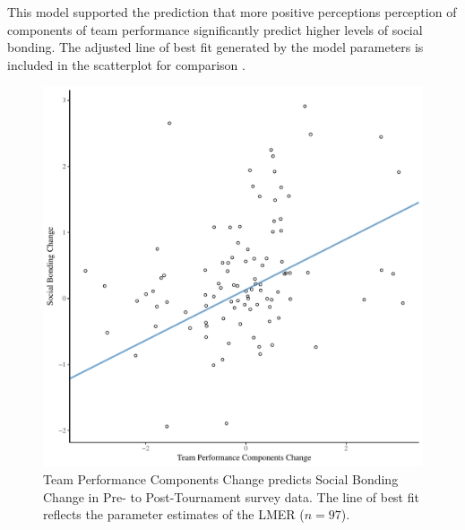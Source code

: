 \begin{CJK}{UTF8}{gbsn}
This model supported the prediction that more positive perceptions perception of components of team performance significantly predict  higher levels of social bonding. The adjusted line of best fit generated by the model parameters is included in the scatterplot for comparison .


  \begin{figure}[htbp]
    \centering
  \includegraphics[scale=.5]{images/jasBondDeltaModelSlope.pdf}
    \caption{Team Performance Components Change predicts Social Bonding Change in Pre- to Post-Tournament survey data. The line of best fit reflects the parameter estimates of the LMER ($n = 97$).}
    \label{fig:jasBondDeltaModelSlope}
  \end{figure}














\end{CJK}
